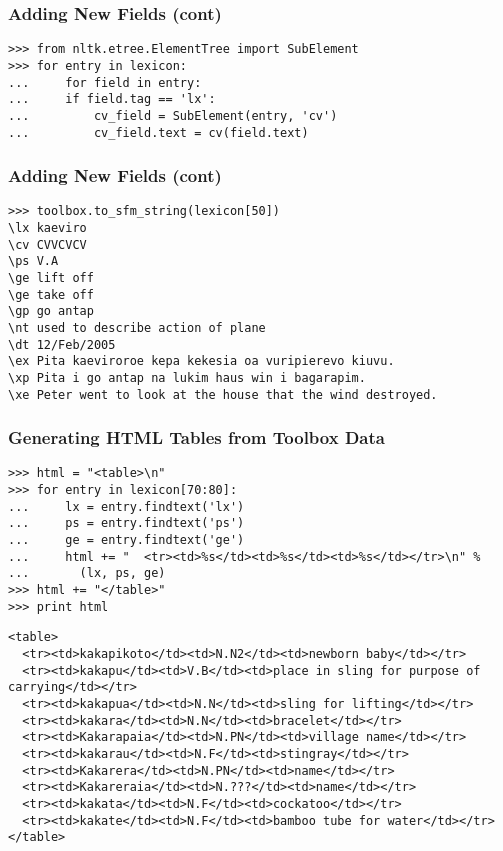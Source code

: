 \documentclass{beamer}             %
\begin{document}
\begin{frame}[fragile]
\frametitle{Adding New Fields (cont)}
\small

\begin{verbatim}
>>> from nltk.etree.ElementTree import SubElement
>>> for entry in lexicon:
...     for field in entry:
...	    if field.tag == 'lx':
...         cv_field = SubElement(entry, 'cv')
...         cv_field.text = cv(field.text)
\end{verbatim}
\end{frame}

\begin{frame}[fragile]
\frametitle{Adding New Fields (cont)}
\scriptsize
\begin{verbatim}
>>> toolbox.to_sfm_string(lexicon[50])
\lx kaeviro
\cv CVVCVCV
\ps V.A
\ge lift off
\ge take off
\gp go antap
\nt used to describe action of plane
\dt 12/Feb/2005
\ex Pita kaeviroroe kepa kekesia oa vuripierevo kiuvu.
\xp Pita i go antap na lukim haus win i bagarapim.
\xe Peter went to look at the house that the wind destroyed.
\end{verbatim}
\end{frame}

\begin{frame}[fragile]
\frametitle{Generating HTML Tables from Toolbox Data}

\scriptsize
\begin{verbatim}
>>> html = "<table>\n"
>>> for entry in lexicon[70:80]:
...     lx = entry.findtext('lx')
...     ps = entry.findtext('ps')
...     ge = entry.findtext('ge')
...     html += "  <tr><td>%s</td><td>%s</td><td>%s</td></tr>\n" %
...       (lx, ps, ge)
>>> html += "</table>"
>>> print html
\end{verbatim}

\tiny

\begin{verbatim}
<table>
  <tr><td>kakapikoto</td><td>N.N2</td><td>newborn baby</td></tr>
  <tr><td>kakapu</td><td>V.B</td><td>place in sling for purpose of carrying</td></tr>
  <tr><td>kakapua</td><td>N.N</td><td>sling for lifting</td></tr>
  <tr><td>kakara</td><td>N.N</td><td>bracelet</td></tr>
  <tr><td>Kakarapaia</td><td>N.PN</td><td>village name</td></tr>
  <tr><td>kakarau</td><td>N.F</td><td>stingray</td></tr>
  <tr><td>Kakarera</td><td>N.PN</td><td>name</td></tr>
  <tr><td>Kakareraia</td><td>N.???</td><td>name</td></tr>
  <tr><td>kakata</td><td>N.F</td><td>cockatoo</td></tr>
  <tr><td>kakate</td><td>N.F</td><td>bamboo tube for water</td></tr>
</table>
\end{verbatim}
\end{frame}
\end{document}
